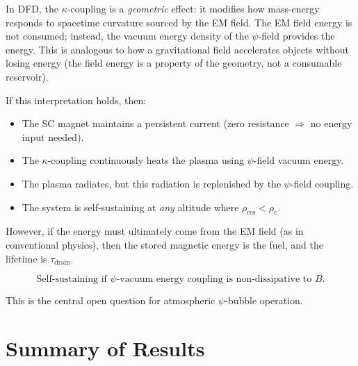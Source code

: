 \documentclass[12pt,a4paper]{article}
\begin{document}
In DFD, the $\kappa$-coupling is a \emph{geometric} effect: it modifies how mass-energy
responds to spacetime curvature sourced by the EM field.  The EM field energy is not
consumed; instead, the vacuum energy density of the $\psi$-field provides the energy.
This is analogous to how a gravitational field accelerates objects without losing energy
(the field energy is a property of the geometry, not a consumable reservoir).

If this interpretation holds, then:
\begin{itemize}
  \item The SC magnet maintains a persistent current (zero resistance $\Rightarrow$ no energy
        input needed).
  \item The $\kappa$-coupling continuously heats the plasma using $\psi$-field vacuum energy.
  \item The plasma radiates, but this radiation is replenished by the $\psi$-field coupling.
  \item The system is self-sustaining at \emph{any} altitude where $\rho_{\text{res}} < \rho_c$.
\end{itemize}

However, if the energy must ultimately come from the EM field (as in conventional physics),
then the stored magnetic energy is the fuel, and the lifetime is $\tau_{\text{drain}}$.

\begin{equation}
  \boxed{
  \text{Self-sustaining if } \psi\text{-vacuum energy coupling is non-dissipative to } B.
  }
\end{equation}

This is the central open question for atmospheric $\psi$-bubble operation.

\section{Summary of Results}
\label{sec:summary}
\end{document}
